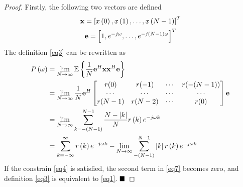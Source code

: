 \documentclass[10pt]{article}
\newtheorem*{proof}{Proof}[section]
\begin{document}
\begin{proof}
	Firstly, the following two vectors are defined                                                                                                                                                                                                                                                                                                                                                                                                                                                                                                                                                                                                                                                                                                                                                                                                                                                                                                                                                                                                                                                                                                                                                                                                                                      
	\begin{gather}
		{\bf{x}}=\left[x\left(0\right),x\left(1\right),\ldots,x\left(N-1\right)\right]^T \label{eq5}\\
		{\bf{e}}=\left[1,e^{-j\omega},\ldots,e^{-j\left(N-1\right)\omega}\right]^T \label{eq6}
	\end{gather}
	The definition \eqref{eq3} can be rewritten as 
	\begin{align}
		P\left(\omega\right) &= \lim_{N\rightarrow\infty}{\mathbb{E}}\left\{\frac{1}{N}\mathbf{e}^H\mathbf{x}\mathbf{x}^H\mathbf{e}\right\} \nonumber \\
		&=\lim_{N\rightarrow\infty} {\frac{1}{N}} {\bf{e}}^H \left[ \begin{matrix} r(0)&r(-1)&\cdots&r(-(N-1)) \\ \cdots&\cdots&\cdots&\cdots \\ r(N-1)&r(N-2)&\cdots&r(0) \end{matrix} \right]{\bf{e}} \nonumber \\
		&=\lim_{N\rightarrow\infty}{\sum_{k=-\left(N-1\right)}^{N-1}{\frac{N-\left|k\right|}{N}r\left(k\right)e^{-j\omega k}}} \nonumber \\
		&=\sum_{k=-\infty}^{\infty}{r\left(k\right)e^{-j\omega k}}-\lim_{N \rightarrow \infty} {\sum_{-\left(N-1\right)}^{N-1}{\left|k\right|r\left(k\right)e^{-j\omega k}}} \label{eq7}
	\end{align}
	If the constrain \eqref{eq4} is satisfied, the second term in \eqref{eq7} becomes zero, 
	and definition \eqref{eq3} is equivalent to \eqref{eq1}. $\hfill\blacksquare$ 
\end{proof}
\end{document}
